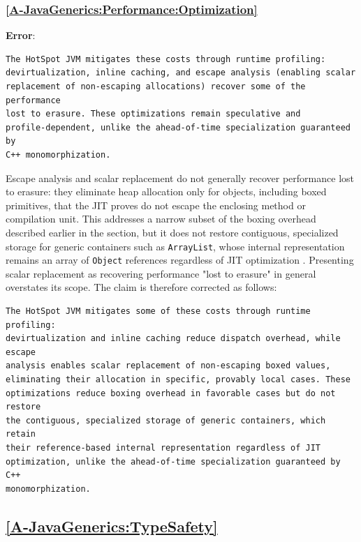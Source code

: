 \documentclass[11pt]{report}
\begin{document}
\subsubsection*{\hyperref[A-JavaGenerics:Performance:Optimization]{\ref*{A-JavaGenerics:Performance:Optimization} }}
\noindent\textbf{Error}:
\begin{Verbatim}[breaklines=true]
The HotSpot JVM mitigates these costs through runtime profiling:
devirtualization, inline caching, and escape analysis (enabling scalar
replacement of non-escaping allocations) recover some of the performance
lost to erasure. These optimizations remain speculative and
profile-dependent, unlike the ahead-of-time specialization guaranteed by
C++ monomorphization.
\end{Verbatim}
Escape analysis and scalar replacement do not generally recover performance
lost to erasure: they eliminate heap allocation only for objects, including
boxed primitives, that the JIT proves do not escape the enclosing method or
compilation unit. This addresses a narrow subset of the boxing overhead
described earlier in the section, but it does not restore contiguous,
specialized storage for generic containers such as \texttt{ArrayList},
whose internal representation remains an array of \texttt{Object}
references regardless of JIT optimization \cite{jvms2024}. Presenting scalar
replacement as recovering performance "lost to erasure" in general
overstates its scope. The claim is therefore corrected as follows:
\begin{Verbatim}[breaklines=true]
The HotSpot JVM mitigates some of these costs through runtime profiling:
devirtualization and inline caching reduce dispatch overhead, while escape
analysis enables scalar replacement of non-escaping boxed values,
eliminating their allocation in specific, provably local cases. These
optimizations reduce boxing overhead in favorable cases but do not restore
the contiguous, specialized storage of generic containers, which retain
their reference-based internal representation regardless of JIT
optimization, unlike the ahead-of-time specialization guaranteed by C++
monomorphization.
\end{Verbatim}

\subsection*{\hyperref[A-JavaGenerics:TypeSafety]{\ref*{A-JavaGenerics:TypeSafety} }}
\end{document}
